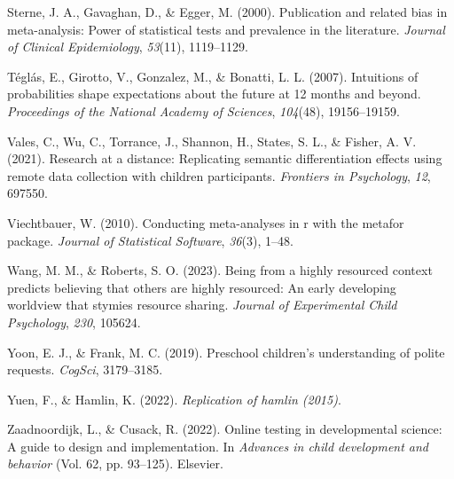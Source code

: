 \documentclass[
  man,floatsintext]{apa6}
\newlength{\cslhangindent}
\newlength{\cslentryspacingunit} %
\newenvironment{CSLReferences}[2] %
 {%
  \setlength{\parindent}{0pt}
  \ifodd #1
  \let\oldpar\par
  \def\par{\hangindent=\cslhangindent\oldpar}
  \fi
  \setlength{\parskip}{#2\cslentryspacingunit}
 }%
 {}
\begin{document}
\begin{CSLReferences}{1}{0}
\leavevmode{}%
Sterne, J. A., Gavaghan, D., \& Egger, M. (2000). Publication and related bias in meta-analysis: Power of statistical tests and prevalence in the literature. \emph{Journal of Clinical Epidemiology}, \emph{53}(11), 1119--1129.

\leavevmode{}%
Téglás, E., Girotto, V., Gonzalez, M., \& Bonatti, L. L. (2007). Intuitions of probabilities shape expectations about the future at 12 months and beyond. \emph{Proceedings of the National Academy of Sciences}, \emph{104}(48), 19156--19159.

\leavevmode{}%
Vales, C., Wu, C., Torrance, J., Shannon, H., States, S. L., \& Fisher, A. V. (2021). Research at a distance: Replicating semantic differentiation effects using remote data collection with children participants. \emph{Frontiers in Psychology}, \emph{12}, 697550.

\leavevmode{}%
Viechtbauer, W. (2010). Conducting meta-analyses in r with the metafor package. \emph{Journal of Statistical Software}, \emph{36}(3), 1--48.

\leavevmode{}%
Wang, M. M., \& Roberts, S. O. (2023). Being from a highly resourced context predicts believing that others are highly resourced: An early developing worldview that stymies resource sharing. \emph{Journal of Experimental Child Psychology}, \emph{230}, 105624.

\leavevmode{}%
Yoon, E. J., \& Frank, M. C. (2019). Preschool children's understanding of polite requests. \emph{CogSci}, 3179--3185.

\leavevmode{}%
Yuen, F., \& Hamlin, K. (2022). \emph{Replication of hamlin (2015)}.

\leavevmode{}%
Zaadnoordijk, L., \& Cusack, R. (2022). Online testing in developmental science: A guide to design and implementation. In \emph{Advances in child development and behavior} (Vol. 62, pp. 93--125). Elsevier.

\end{CSLReferences}
\end{document}
